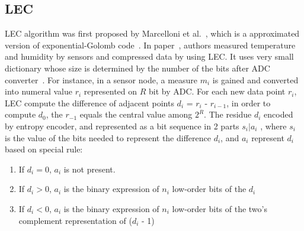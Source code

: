 \subsection{LEC}
LEC algorithm was first proposed by Marcelloni et
al.~\cite{marcelloni2008simple}, which is a approximated version of
exponential-Golomb code~\cite{teuhola1978compression}. In
paper~\cite{marcelloni2008simple}, authors measured temperature and humidity by
sensors and compressed data by using LEC. It uses very small dictionary whose
size is determined by the number of the bits after ADC
converter~\cite{marcelloni2008simple,marcelloni2009efficient}.  For instance, in
a sensor node, a measure $m_i$ is gained and converted into numeral value $r_i$
represented on $R$ bit by ADC. For each new data point $r_i$, LEC compute the
difference of adjacent points $d_i$ = $r_i$ - $r_{i-1}$, in order to compute
$d_0$, the $r_{-1}$ equals the central value among $2^R$. The residue $d_i$
encoded by entropy encoder, and represented as a bit sequence in 2 parts $s_i |
a_i$ , where $s_i$ is the value of the bits needed to represent the difference
$d_i$, and $a_i$ represent $d_i$ based on special rule:
\begin{enumerate}
    \item If $d_i = 0$, $a_i$ is not present.    
    \item If $d_i > 0$, $a_i$ is the binary expression of $n_i$ low-order bits
    of the $d_i$
    \item If $d_i < 0$, $a_i$ is the binary expression of $n_i$ low-order bits
    of the two's complement representation of ($d_i$ - 1)
\end{enumerate}


